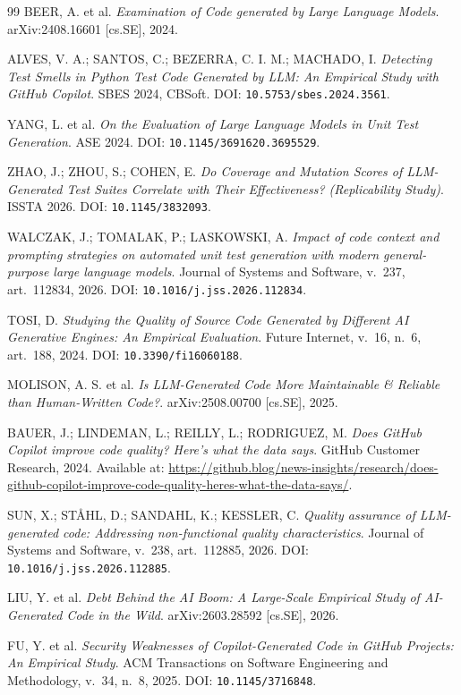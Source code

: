 \documentclass[11pt]{article}
\begin{document}
\begin{thebibliography}{99}
 BEER, A. et al. \emph{Examination of Code generated by Large Language Models}. arXiv:2408.16601 {[cs.SE]}, 2024.

 ALVES, V. A.; SANTOS, C.; BEZERRA, C. I. M.; MACHADO, I. \emph{Detecting Test Smells in Python Test Code Generated by LLM: An Empirical Study with GitHub Copilot}. SBES 2024, CBSoft. DOI: \texttt{10.5753/sbes.2024.3561}.

 YANG, L. et al. \emph{On the Evaluation of Large Language Models in Unit Test Generation}. ASE 2024. DOI: \texttt{10.1145/3691620.3695529}.

 ZHAO, J.; ZHOU, S.; COHEN, E. \emph{Do Coverage and Mutation Scores of LLM-Generated Test Suites Correlate with Their Effectiveness? (Replicability Study)}. ISSTA 2026. DOI: \texttt{10.1145/3832093}.

 WALCZAK, J.; TOMALAK, P.; LASKOWSKI, A. \emph{Impact of code context and prompting strategies on automated unit test generation with modern general-purpose large language models}. Journal of Systems and Software, v.~237, art.~112834, 2026. DOI: \texttt{10.1016/j.jss.2026.112834}.

 TOSI, D. \emph{Studying the Quality of Source Code Generated by Different AI Generative Engines: An Empirical Evaluation}. Future Internet, v.~16, n.~6, art.~188, 2024. DOI: \texttt{10.3390/fi16060188}.

 MOLISON, A. S. et al. \emph{Is LLM-Generated Code More Maintainable \& Reliable than Human-Written Code?}. arXiv:2508.00700 {[cs.SE]}, 2025.

 BAUER, J.; LINDEMAN, L.; REILLY, L.; RODRIGUEZ, M. \emph{Does GitHub Copilot improve code quality? Here's what the data says}. GitHub Customer Research, 2024. Available at: \url{https://github.blog/news-insights/research/does-github-copilot-improve-code-quality-heres-what-the-data-says/}.

 SUN, X.; ST{\AA}HL, D.; SANDAHL, K.; KESSLER, C. \emph{Quality assurance of LLM-generated code: Addressing non-functional quality characteristics}. Journal of Systems and Software, v.~238, art.~112885, 2026. DOI: \texttt{10.1016/j.jss.2026.112885}.

 LIU, Y. et al. \emph{Debt Behind the AI Boom: A Large-Scale Empirical Study of AI-Generated Code in the Wild}. arXiv:2603.28592 {[cs.SE]}, 2026.

 FU, Y. et al. \emph{Security Weaknesses of Copilot-Generated Code in GitHub Projects: An Empirical Study}. ACM Transactions on Software Engineering and Methodology, v.~34, n.~8, 2025. DOI: \texttt{10.1145/3716848}.


\end{thebibliography}
\end{document}
